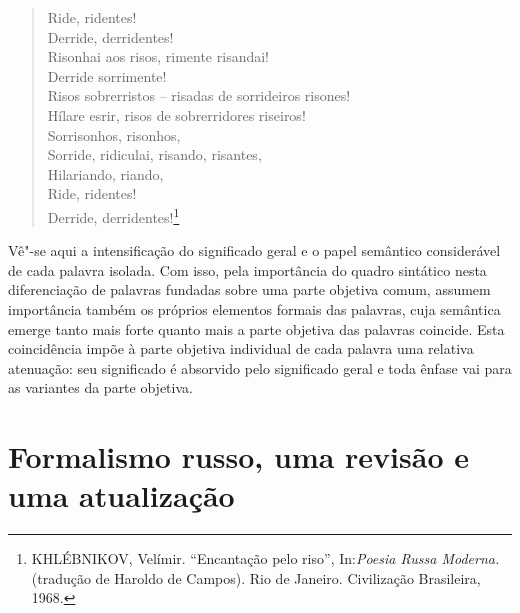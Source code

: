 \begin{verse}
Ride, ridentes! \\
Derride, derridentes! \\
Risonhai aos risos, rimente risandai! \\
Derride sorrimente! \\
Risos sobrerristos -- risadas de sorrideiros \qb{}risones! \\
Hílare esrir, risos de sobrerridores riseiros! \\
Sorrisonhos, risonhos, \\
Sorride, ridiculai, risando, risantes, \\
Hilariando, riando, \\
Ride, ridentes! \\
Derride, derridentes!\footnote{KHLÉBNIKOV, Velímir. ``Encantação pelo
  riso'', In:\emph{Poesia Russa Moderna.}(tradução de Haroldo de
  Campos). Rio de Janeiro. Civilização Brasileira, 1968.}
\end{verse}

Vê"-se aqui a intensificação do significado geral e o papel semântico
considerável de cada palavra isolada. Com isso, pela importância do
quadro sintático nesta diferenciação de palavras fundadas sobre uma
parte objetiva comum, assumem importância também os próprios elementos
formais das palavras, cuja semântica emerge tanto mais forte quanto mais
a parte objetiva das palavras coincide. Esta coincidência impõe à parte
objetiva individual de cada palavra uma relativa atenuação: seu
significado é absorvido pelo significado geral e toda ênfase vai para as
variantes da parte objetiva.


\chapter{Formalismo russo, uma revisão e uma atualização}

